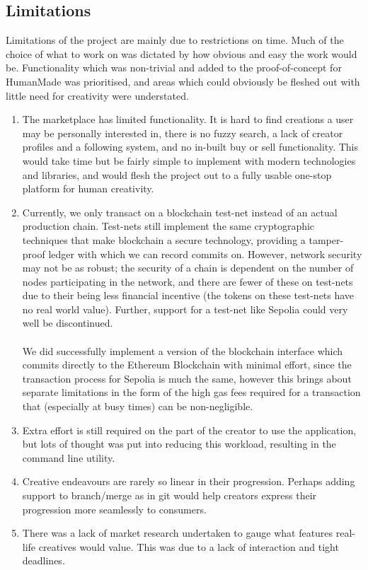 \documentclass[12pt,a4paper]{article}
\begin{document}
\subsection{Limitations}
Limitations of the project are mainly due to restrictions on time. Much of the choice of what to work on was dictated by how obvious and easy the work would be. Functionality which was non-trivial and added to the proof-of-concept for HumanMade was prioritised, and areas which could obviously be fleshed out with little need for creativity were understated.
\begin{enumerate}
    \item The marketplace has limited functionality. It is hard to find creations a user may be personally interested in, there is no fuzzy search, a lack of creator profiles and a following system, and no in-built buy or sell functionality. This would take time but be fairly simple to implement with modern technologies and libraries, and would flesh the project out to a fully usable one-stop platform for human creativity.
    \item Currently, we only transact on a blockchain test-net instead of an actual production chain. Test-nets still implement the same cryptographic techniques that make blockchain a secure technology, providing a tamper-proof ledger with which we can record commits on. However, network security may not be as robust; the security of a chain is dependent on the number of nodes participating in the network, and there are fewer of these on test-nets due to their being less financial incentive (the tokens on these test-nets have no real world value). Further, support for a test-net like Sepolia could very well be discontinued.\\\\We did successfully implement a version of the blockchain interface which commits directly to the Ethereum Blockchain with minimal effort, since the transaction process for Sepolia is much the same, however this brings about separate limitations in the form of the high gas fees required for a transaction that (especially at busy times) can be non-negligible.
    \item Extra effort is still required on the part of the creator to use the application, but lots of thought was put into reducing this workload, resulting in the command line utility.
    \item Creative endeavours are rarely so linear in their progression. Perhaps adding support to branch/merge as in git would help creators express their progression more seamlessly to consumers.
    \item There was a lack of market research undertaken to gauge what features real-life creatives would value. This was due to a lack of interaction and tight deadlines.
\end{enumerate}
\end{document}
